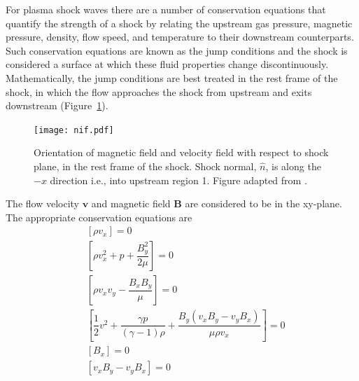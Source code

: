 For plasma shock waves there are a number of conservation equations that quantify the strength of a shock by relating the upstream gas pressure, magnetic pressure, density, flow speed, and temperature to their downstream counterparts. Such conservation equations are known as the jump conditions and the shock is considered a surface at which these fluid properties change discontinuously. Mathematically, the jump conditions are best treated in the rest frame of the shock, in which the flow approaches the shock from upstream and exits downstream (Figure~\ref{fig:shock_pic}).
\begin{figure}[h!]
\begin{center}
\texttt{[image: nif.pdf]}
\caption[MHD shock framework]{Orientation of magnetic field and velocity field with respect to shock plane, in the rest frame of the shock. Shock normal, $\hat{n}$, is along the $-x$ direction i.e., into upstream region 1. Figure adapted from \citet{ball2001}.}
\label{fig:shock_pic}
\end{center}
\end{figure}
The flow velocity $\mathbf{v}$ and magnetic field $\mathbf{B}$ are considered to be in the xy-plane. The appropriate conservation  equations are
\begin{subequations}
\begin{align}
&[\rho v_{x}]=0 \\
&[\rho v_{x}^2+p+\dfrac{B_{y}^2}{2\mu}]=0 \\
&[\rho v_{x}v_{y} - \dfrac{B_{x}B_{y}}{\mu}]=0 \\
&[\dfrac{1}{2}v^2 + \dfrac{\gamma p}{(\gamma-1) \rho}+\dfrac{ B_{y}(v_{x}B_{y} - v_{y}B_{x})}{\mu \rho v_{x}} ]=0 \\
&[B_{x}]=0 \\
&[v_{x}B_{y} - v_{y}B_{x}]=0 
\end{align}
\label{eqn:jump_conditions}
\end{subequations}
